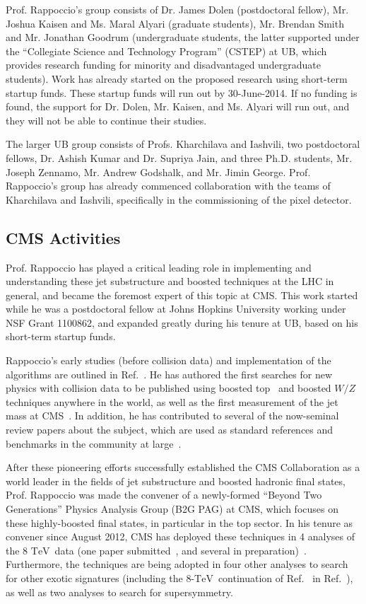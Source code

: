 \documentclass[12pt]{proposalnsf}
\newcommand{\TeV}{\ensuremath{\mathrm{TeV}}}
\begin{document}
Prof. Rappoccio's group consists
of Dr. James Dolen (postdoctoral fellow), Mr. Joshua Kaisen and Ms. Maral Alyari
(graduate students), Mr. Brendan Smith and Mr. Jonathan Goodrum (undergraduate
students, the latter supported under the ``Collegiate Science and
Technology Program'' (CSTEP)
at UB, which provides research funding for minority and
disadvantaged undergraduate students). Work has already started
on the proposed research using short-term startup funds. 
These startup funds will run out by 30-June-2014. If no funding is
found, the support for Dr. Dolen, Mr. Kaisen, and Ms. Alyari will run
out, and they will not be able to continue their studies. 

The larger UB group consists of Profs. Kharchilava and Iashvili, two
postdoctoral fellows, Dr. Ashish Kumar and Dr. Supriya Jain, and three
Ph.D. students, Mr. Joseph Zennamo, Mr. Andrew Godshalk, and Mr. Jimin
George. Prof. Rappoccio's group has already commenced collaboration
with the teams of Kharchilava and Iashvili, specifically in the
commissioning of the pixel detector. 



\subsection{CMS Activities}
\label{sec:priorcms}

Prof. Rappoccio has played a critical leading role in implementing and
understanding these jet substructure and boosted techniques at the LHC
in general, and became the foremost expert of this topic at CMS. This
work started while he was
a postdoctoral fellow at Johns Hopkins University working under NSF
Grant 1100862, and expanded greatly during his tenure at UB, based on
his short-term startup funds. 

Rappoccio's early studies (before collision data) and
implementation of the algorithms are outlined in
Ref.~\cite{catop_cms}. He has authored the first searches
for new physics with collision data to be published using boosted
top~\cite{EXO-11-006} and boosted $W/Z$~\cite{EXO-11-095} techniques
anywhere in the world, as well as the first measurement of the jet
mass at CMS~\cite{SMP-12-019}. In addition, he has contributed to
several of the now-seminal review papers about the subject, which are
used as standard references and benchmarks in the community at
large~\cite{boost2010,boost2011}. 

After these pioneering efforts successfully established the CMS
Collaboration as a world leader in the fields of jet substructure and
boosted hadronic final states, Prof. Rappoccio
was made the convener of a newly-formed ``Beyond Two Generations'' Physics
Analysis Group (B2G PAG) at CMS, which focuses on these highly-boosted
final states, in particular in the top sector. 
In his tenure as convener since August 2012, CMS has deployed these
techniques in 4 analyses of the 8 \TeV\ data (one paper
submitted~\cite{B2G-13-001}, and several in
preparation)~\cite{B2G-12-012,B2G-12-015,B2G-12-019}. 
Furthermore, the techniques are being adopted in four other
analyses to search for other exotic signatures (including the 8-\TeV\
continuation of Ref.~\cite{EXO-11-095} in Ref.~\cite{EXO-12-024}), as
well as two analyses to search for supersymmetry. 
\end{document}
